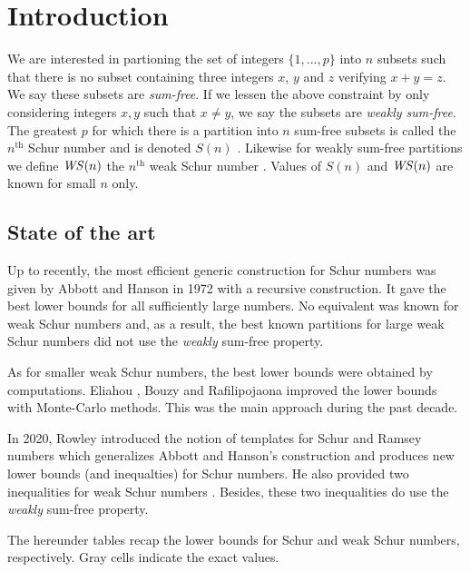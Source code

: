 \section{Introduction}

We are interested in partioning the set of integers \(\{1, ..., p\}\) into \(n\) subsets such that there is no 
subset containing three integers \(x\), \(y\) and \(z\) verifying \(x + y = z\). We say these subsets are 
\textit{sum-free}. If we lessen the above constraint by only considering integers \(x,y\) such that \(x \neq y\), we say the subsets are \textit{weakly sum-free}. The 
greatest \(p\) for which there is a partition into \(n\) sum-free subsets is called the \(n^{\text{th}}\) Schur 
number and is denoted \(S(n)\) \cite{Schur1917}. Likewise for weakly sum-free partitions we define \(\mathit{WS}(n)\) 
the \(n^{\text{th}}\) weak Schur number \cite{Irving1973}. Values of \(S(n)\) and \(\mathit{WS}(n)\) are known for small \(n\) only.


\subsection{State of the art}

Up to recently, the most efficient generic construction for Schur numbers was given by Abbott and Hanson 
\cite{AbbottHanson} in 1972 with a recursive construction. It gave the best lower bounds for all sufficiently large 
numbers. No equivalent was known for weak Schur numbers and, as a result, the best known partitions for large 
weak Schur numbers did not use the \textit{weakly} sum-free property. 

\par
As for smaller weak Schur numbers, the best lower bounds were obtained by computations. Eliahou 
\cite{EliahouBook}, Bouzy \cite{Bouzy2015AnAP} and Rafilipojaona \cite{Rafilipojaona} improved the lower 
bounds with Monte-Carlo methods. This was the main approach during the past decade.

\par
In 2020, Rowley introduced the notion of templates for Schur and Ramsey numbers \cite{RowleyRamsey} which 
generalizes Abbott and Hanson's construction and produces new lower bounds (and inequalties) for Schur numbers. 
He also provided two inequalities for weak Schur numbers \cite{RowleyWS}. Besides, these two inequalities do use the \textit{weakly} sum-free property.

\par The hereunder tables recap the lower bounds for Schur and weak Schur numbers, respectively. Gray cells 
indicate the exact values.


